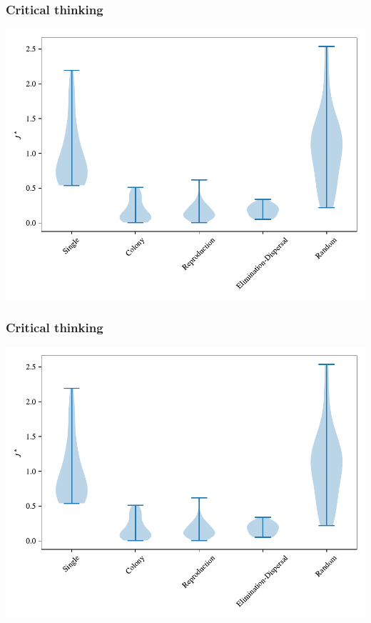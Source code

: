 \documentclass{beamer}
\begin{document}
\begin{frame}
\frametitle{Critical thinking}
\begin{center}
\includegraphics{assets/compared}
\end{center}
\end{frame}

\begin{frame}
\frametitle{Critical thinking}
\includegraphics{assets/compared}
\end{frame}
\end{document}

